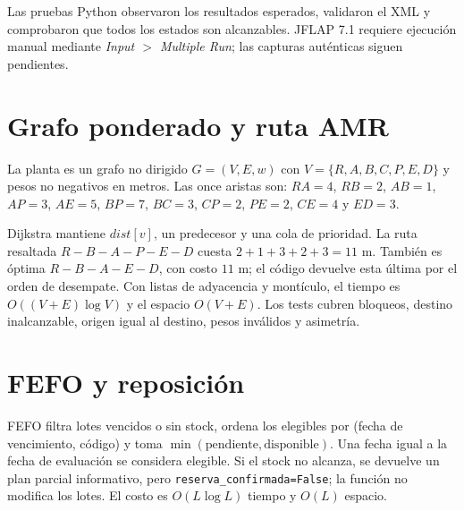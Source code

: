 \documentclass[11pt,a4paper]{article}
\newcommand{\code}[1]{\texttt{#1}}
\begin{document}
Las pruebas Python observaron los resultados esperados, validaron el XML y comprobaron que todos los estados son alcanzables. JFLAP 7.1 requiere ejecución manual mediante \emph{Input $>$ Multiple Run}; las capturas auténticas siguen pendientes.

\section{Grafo ponderado y ruta AMR}

La planta es un grafo no dirigido $G=(V,E,w)$ con $V=\{R,A,B,C,P,E,D\}$ y pesos no negativos en metros. Las once aristas son: $RA=4$, $RB=2$, $AB=1$, $AP=3$, $AE=5$, $BP=7$, $BC=3$, $CP=2$, $PE=2$, $CE=4$ y $ED=3$.

\begin{center}
\end{center}

Dijkstra mantiene $dist[v]$, un predecesor y una cola de prioridad. La ruta resaltada $R-B-A-P-E-D$ cuesta $2+1+3+2+3=11$ m. También es óptima $R-B-A-E-D$, con costo $11$ m; el código devuelve esta última por el orden de desempate. Con listas de adyacencia y montículo, el tiempo es $O((V+E)\log V)$ y el espacio $O(V+E)$. Los tests cubren bloqueos, destino inalcanzable, origen igual al destino, pesos inválidos y asimetría.

\section{FEFO y reposición}

FEFO filtra lotes vencidos o sin stock, ordena los elegibles por (fecha de vencimiento, código) y toma $\min(\text{pendiente},\text{disponible})$. Una fecha igual a la fecha de evaluación se considera elegible. Si el stock no alcanza, se devuelve un plan parcial informativo, pero \code{reserva_confirmada=False}; la función no modifica los lotes. El costo es $O(L\log L)$ tiempo y $O(L)$ espacio.
\end{document}
